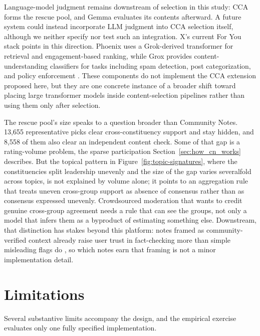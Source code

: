 \documentclass[10pt,twocolumn]{article}
\begin{document}
Language-model judgment remains downstream of selection in this study: CCA
forms the rescue pool, and Gemma evaluates its contents afterward. A future
system could instead incorporate LLM judgment into CCA selection itself,
although we neither specify nor test such an integration. X's current For You
stack points in this direction. Phoenix uses a Grok-derived transformer for
retrieval and engagement-based ranking, while Grox provides content-understanding
classifiers for tasks including spam detection, post categorization, and policy
enforcement \citep{xai2026algorithm}. These components do not implement the CCA
extension proposed here, but they are one concrete instance of a broader shift
toward placing large transformer models inside content-selection pipelines
rather than using them only after selection.

The rescue pool's size speaks to a question broader than Community Notes.
13,655 representative picks clear cross-constituency support and stay
hidden, and 8,558 of them also clear an independent content check. Some of
that gap is a rating-volume problem, the sparse participation
Section~\ref{sec:how_cn_works} describes. But the topical pattern in
Figure~\ref{fig:topic-signatures}, where the constituencies split leadership
unevenly and the size of the gap varies severalfold across topics, is not
explained by volume alone; it points to an aggregation rule that treats
uneven cross-group support as absence of consensus rather than as
consensus expressed unevenly. Crowdsourced moderation that wants to credit
genuine cross-group agreement needs a rule that can see the groups, not only
a model that infers them as a byproduct of estimating something else.
Downstream, that distinction has stakes beyond this platform: notes framed
as community-verified context already raise user trust in fact-checking more
than simple misleading flags do \citep{drolsbach2024trust}, so which notes
earn that framing is not a minor implementation detail.

\section{Limitations}
\label{sec:limitations}

Several substantive limits accompany the design, and the empirical exercise
evaluates only one fully specified implementation.
\end{document}
